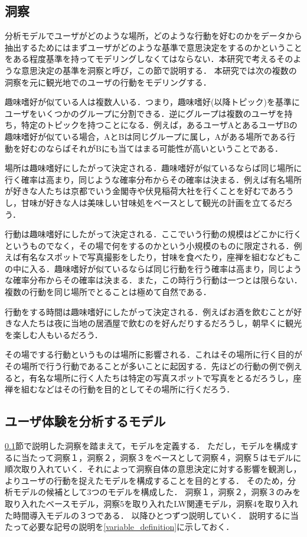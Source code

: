 \documentclass[a4j,10pt, twocolumn]{jarticle}
\begin{document}
\subsection{洞察} \label{intuition}
分析モデルでユーザがどのような場所，どのような行動を好むのかをデータから抽出するためにはまずユーザがどのような基準で意思決定をするのかということをある程度基準を持ってモデリングしなくてはならない．本研究で考えるそのような意思決定の基準を洞察と呼び，この節で説明する．
本研究では次の複数の洞察を元に観光地でのユーザの行動をモデリングする．

\begin{description}
  \setlength{\leftskip}{.5cm}
  \item[\textbf{洞察1}] 趣味嗜好が似ている人は複数人いる．つまり，趣味嗜好(以降トピック)を基準にユーザをいくつかのグループに分割できる．逆にグループは複数のユーザを持ち，特定のトピックを持つことになる．例えば，あるユーザAとあるユーザBの趣味嗜好が似ている場合，AとBは同じグループに属し，Aがある場所である行動を好むのならばそれがBにも当てはまる可能性が高いということである．
  \item[\textbf{洞察2}] 場所は趣味嗜好にしたがって決定される．趣味嗜好が似ているならば同じ場所に行く確率は高まり，同じような確率分布からその確率は決まる．例えば有名場所が好きな人たちは京都でいう金閣寺や伏見稲荷大社を行くことを好むであろうし，甘味が好きな人は美味しい甘味処をベースとして観光の計画を立てるだろう．
  \item[\textbf{洞察3}] 行動は趣味嗜好にしたがって決定される．ここでいう行動の規模はどこかに行くというものでなく，その場で何をするのかという小規模のものに限定される．例えば有名なスポットで写真撮影をしたり，甘味を食べたり，座禅を組むなどもこの中に入る．趣味嗜好が似ているならば同じ行動を行う確率は高まり，同じような確率分布からその確率は決まる．また，この時行う行動は一つとは限らない．複数の行動を同じ場所でとることは極めて自然である．
  \item[\textbf{洞察4}] 行動をする時間は趣味嗜好にしたがって決定される．例えばお酒を飲むことが好きな人たちは夜に当地の居酒屋で飲むのを好んだりするだろうし，朝早くに観光を楽しむ人もいるだろう．
  \item[\textbf{洞察5}] その場でする行動というものは場所に影響される．これはその場所に行く目的がその場所で行う行動であることが多いことに起因する．先ほどの行動の例で例えると，有名な場所に行く人たちは特定の写真スポットで写真をとるだろうし，座禅を組むなどはその行動を目的としてその場所に行くだろう．
\end{description}
%
\subsection{ユーザ体験を分析するモデル} \label{model_definition}
\ref{intuition}節で説明した洞察を踏まえて，モデルを定義する．
ただし，モデルを構成するに当たって洞察１，洞察２，洞察３をベースとして洞察４，洞察５はモデルに順次取り入れていく．それによって洞察自体の意思決定に対する影響を観測し，よりユーザの行動を捉えたモデルを構成することを目的とする．
そのため，分析モデルの候補として3つのモデルを構成した．
洞察１，洞察２，洞察３のみを取り入れたベースモデル，洞察5を取り入れたLW関連モデル，洞察4を取り入れた時間導入モデルの３つである．
以降ひとつずつ説明していく．
説明するに当たって必要な記号の説明を\ref{variable_definition}に示しておく．
\end{document}
